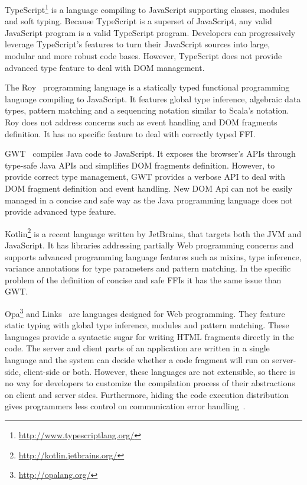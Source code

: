 \documentclass[runningheads,a4paper]{llncs}
\begin{document}
TypeScript\footnote{\href{http://www.typescriptlang.org/}{http://www.typescriptlang.org/}} is a language compiling to
JavaScript supporting classes, modules and soft typing. Because TypeScript is a superset of JavaScript, any valid
JavaScript program is a valid TypeScript program. Developers can progressively leverage TypeScript’s features to turn
their JavaScript sources into large, modular and more robust code bases. However, TypeScript does not provide advanced type feature to deal with DOM management.

The Roy~\cite{McKenna_Roy} programming language is a statically typed functional programming language compiling to
JavaScript. It features global type inference, algebraic data types, pattern matching and a sequencing notation
similar to Scala’s  notation. Roy does not address concerns such as event handling and DOM fragments
definition. It has no specific feature to deal with correctly typed FFI. 


GWT~\cite{Chaganti07_GWT} compiles Java code to JavaScript. It exposes the browser’s APIs through type-safe Java APIs
and simplifies DOM fragments definition. However, to provide correct type management, GWT provides a verbose API to deal with DOM fragment definition and event handling. New DOM Api can not be easily managed in a concise and safe way as the Java programming language does not provide advanced type feature. 

Kotlin\footnote{\href{http://kotlin.jetbrains.org/}{http://kotlin.jetbrains.org/}} is a recent language written by
JetBrains, that targets both the JVM and JavaScript. It has libraries addressing partially Web programming concerns
and supports advanced programming language features such as mixins, type inference, variance annotations for type
parameters and pattern matching. In the specific problem of the definition of concise and safe FFIs it has the same issue than GWT. 

Opa\footnote{\href{http://opalang.org/}{http://opalang.org/}} and Links~\cite{Cooper07_Links} are languages designed
for Web programming. They feature static typing with global type inference, modules and pattern matching. These
languages provide a syntactic sugar for writing HTML fragments directly in the code. The server and client parts of
an application are written in a single language and the system can decide whether a code fragment will run on
server-side, client-side or both. However, these languages are not extensible, so there is no way for developers to
customize the compilation process of their abstractions on client and server sides. Furthermore, hiding the code
execution distribution gives programmers less control on communication error handling~\cite{Guerraoui99_Distributed}.
\end{document}
